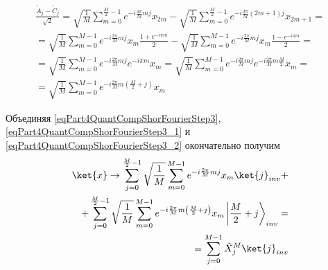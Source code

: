 \begin{eqnarray}
\frac{\tilde{A}_{j} - \tilde{C}_{j} }{\sqrt{2}} = 
\sqrt{\frac{1}{M}} 
\sum_{m = 0}^{\frac{M}{2} - 1} e^{-i \frac{4 \pi}{M} m j} x_{2m}  -
\sqrt{\frac{1}{M}} 
\sum_{m = 0}^{\frac{M}{2} - 1} 
e^{-i \frac{2 \pi}{M} \left(2m+1\right) j} x_{2m+1}
= 
\nonumber \\
=
\sqrt{\frac{1}{M}} \sum_{m = 0}^{M - 1}
e^{-i \frac{2 \pi}{M} m j} x_{m} \frac{1 + e^{-i \pi m}}{2}
-
\sqrt{\frac{1}{M}} \sum_{m = 0}^{M - 1}
e^{-i \frac{2 \pi}{M} m j} x_{m} \frac{1 - e^{-i \pi m}}{2} 
=
\nonumber \\
=
\sqrt{\frac{1}{M}} \sum_{m = 0}^{M - 1}
e^{-i \frac{2 \pi}{M} m j} e^{-i \pi m } x_{m} 
=
\sqrt{\frac{1}{M}} \sum_{m = 0}^{M - 1}
e^{-i \frac{2 \pi}{M} m j} e^{-i \frac{2 \pi}{M} m \frac{M}{2} } x_{m} 
=
\nonumber \\
=
\sqrt{\frac{1}{M}} \sum_{m = 0}^{M - 1}
e^{-i \frac{2 \pi}{M} m \left(\frac{M}{2} + j\right)} x_{m}
\label{eqPart4QuantCompShorFourierStep3_2}
\end{eqnarray}

Объединяя \eqref{eqPart4QuantCompShorFourierStep3}, 
\eqref{eqPart4QuantCompShorFourierStep3_1} и
\eqref{eqPart4QuantCompShorFourierStep3_2} окончательно получим 
\begin{eqnarray}
\ket{x} \rightarrow
\sum_{j = 0}^{\frac{M}{2} - 1} \sqrt{\frac{1}{M}} \sum_{m = 0}^{M - 1}
e^{-i \frac{2 \pi}{M} m j} x_{m} \ket{j}_{inv} +
\nonumber \\
+
\sum_{j = 0}^{\frac{M}{2} - 1} \sqrt{\frac{1}{M}} \sum_{m = 0}^{M - 1}
e^{-i \frac{2 \pi}{M} m \left(\frac{M}{2} + j\right)} x_{m} 
\left|\frac{M}{2} + j\right>_{inv} =
\nonumber \\
= \sum_{j = 0}^{M - 1} \tilde{X}_j^{M} \ket{j}_{inv}
\nonumber
\end{eqnarray}
